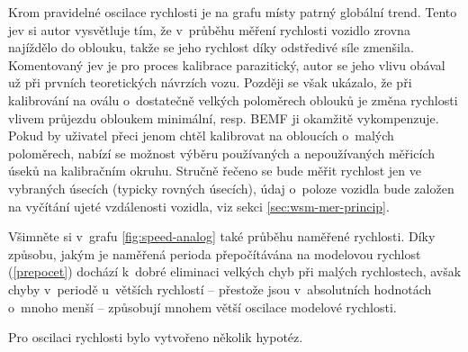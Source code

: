 Krom pravidelné oscilace rychlosti je na grafu místy patrný globální
 trend. Tento jev si autor vysvětluje tím, že v~průběhu měření
rychlosti vozidlo zrovna najíždělo do oblouku, takže se jeho rychlost díky
odstředivé síle zmenšila. Komentovaný jev je pro proces kalibrace parazitický,
autor se jeho vlivu obával už při prvních teoretických návrzích vozu. Později
se však ukázalo, že při kalibrování na oválu o~dostatečně velkých poloměrech
oblouků je změna rychlosti vlivem průjezdu obloukem minimální, resp. BEMF ji
okamžitě vykompenzuje. Pokud by uživatel přeci jenom chtěl kalibrovat na
obloucích o~malých poloměrech, nabízí se možnost výběru používaných a
nepoužívaných měřicích úseků na kalibračním okruhu. Stručně řečeno se bude
měřit rychlost jen ve vybraných úsecích (typicky rovných úsecích), údaj
o~poloze vozidla bude založen na vyčítání ujeté vzdálenosti vozidla, viz sekci
\ref{sec:wsm-mer-princip}.

Všimněte si v~grafu \ref{fig:speed-analog} také průběhu naměřené rychlosti.
Díky způsobu, jakým je naměřená perioda přepočítávána na modelovou rychlost
(\ref{prepocet}) dochází k~dobré eliminaci velkých chyb při malých rychlostech,
avšak chyby v~periodě u~větších rychlostí -- přestože jsou v~absolutních
hodnotách o~mnoho menší -- způsobují mnohem větší oscilace modelové rychlosti.

Pro oscilaci rychlosti bylo vytvořeno několik hypotéz.

